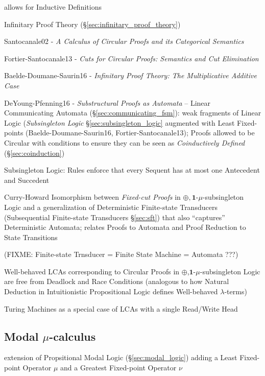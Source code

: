 allows for Inductive Definitions

\fist Infinitary Proof Theory (\S\ref{sec:infinitary_proof_theory})

Santocanale02 - \emph{A Calculus of Circular Proofs and its
  Categorical Semantics}

Fortier-Santocanale13 - \emph{Cuts for Circular Proofs: Semantics and
  Cut Elimination}

Baelde-Doumane-Saurin16 - \emph{Infinitary Proof Theory: The
  Multiplicative Additive Case}

\asterism

DeYoung-Pfenning16 - \emph{Substructural Proofs as Automata} -- Linear
Communicating Automata (\S\ref{sec:communicating_fsm}): weak
fragments of Linear Logic (\emph{Subsingleton Logic}
\S\ref{sec:subsingleton_logic} augmented with Least Fixed-points
(Baelde-Doumane-Saurin16, Fortier-Santocanale13); Proofs allowed to be
Circular with conditions to ensure they can be seen as
\emph{Coinductively Defined} (\S\ref{sec:coinduction})

Subsingleton Logic: Rules enforce that every Sequent has at most one
Antecedent and Succedent

Curry-Howard Isomorphism between \emph{Fixed-cut Proofs} in
$\oplus,\mathbf{1}$-$\mu$-subsingleton Logic and a generalization of
Deterministic Finite-state Transducers (Subsequential Finite-state
Transducers \S\ref{sec:sft}) that also ``captures'' Deterministic
Automata; relates Proofs to Automata and Proof Reduction to State
Transitions

(FIXME: Finite-state Trnsducer = Finite State Machine = Automata ???)

Well-behaved LCAs corresponding to Circular Proofs in
$\oplus$,$\mathbf{1}$-$\mu$-subsingleton Logic are free from Deadlock
and Race Conditions (analogous to how Natural Deduction in
Intuitionistic Propositional Logic defines Well-behaved
$\lambda$-terms)

Turing Machines as a special case of LCAs with a single Read/Write
Head


\asterism


\subsection{Modal $\mu$-calculus}\label{sec:modal_mu_logic}

extension of Propsitional Modal Logic (\S\ref{sec:modal_logic}) adding
a Least Fixed-point Operator $\mu$ and a Greatest Fixed-point Operator
$\nu$

